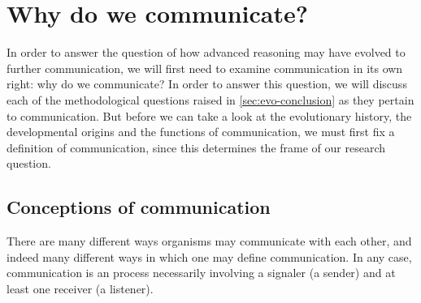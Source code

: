 \chapter{Why do we communicate?}
\label{ch:communication}

In order to answer the question of how advanced reasoning  may have evolved to further communication, we will first need to examine communication in its own right: why do we communicate?
In order to answer this question, we will discuss each of the methodological questions raised in \cref{sec:evo-conclusion} as they pertain to communication. But before we can take a look at the evolutionary history, the developmental origins and the functions of communication, we must first fix a definition of communication, since this determines the frame of our research question.

\section{Conceptions of communication}
\label{sec:comm:definition}


There are many different ways organisms may communicate with each other, and indeed many different ways in which one may define communication. In any case, communication is an process necessarily involving a signaler (a sender) and at least one receiver (a listener).

